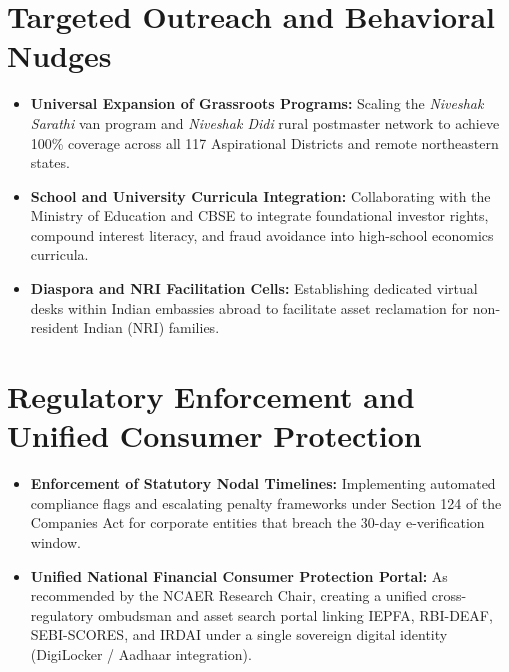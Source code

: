 \documentclass[openany]{book}
\begin{document}
\section{Targeted Outreach and Behavioral Nudges}
\begin{itemize}
    \item \textbf{Universal Expansion of Grassroots Programs:} Scaling the \textit{Niveshak Sarathi} van program and \textit{Niveshak Didi} rural postmaster network to achieve 100\% coverage across all 117 Aspirational Districts and remote northeastern states.
    \item \textbf{School and University Curricula Integration:} Collaborating with the Ministry of Education and CBSE to integrate foundational investor rights, compound interest literacy, and fraud avoidance into high-school economics curricula.
    \item \textbf{Diaspora and NRI Facilitation Cells:} Establishing dedicated virtual desks within Indian embassies abroad to facilitate asset reclamation for non-resident Indian (NRI) families.
\end{itemize}

\section{Regulatory Enforcement and Unified Consumer Protection}
\begin{itemize}
    \item \textbf{Enforcement of Statutory Nodal Timelines:} Implementing automated compliance flags and escalating penalty frameworks under Section 124 of the Companies Act for corporate entities that breach the 30-day e-verification window.
    \item \textbf{Unified National Financial Consumer Protection Portal:} As recommended by the NCAER Research Chair, creating a unified cross-regulatory ombudsman and asset search portal linking IEPFA, RBI-DEAF, SEBI-SCORES, and IRDAI under a single sovereign digital identity (DigiLocker / Aadhaar integration).
\end{itemize}


\end{document}
